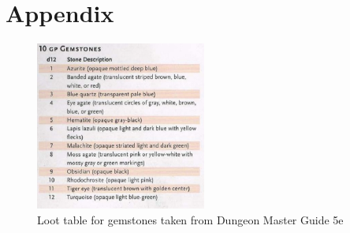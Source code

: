 \documentclass{UoYCSproject}
\begin{document}
\chapter{Appendix}
\label{cha:aB}
\begin{figure}[htb]
  \centering
    \includegraphics[width=0.5\textwidth]{figures/gemstone_table.png}
    \caption{Loot table for gemstones taken from Dungeon Master Guide 5e}
    \label{fig:loot_table}
\end{figure}
\end{document}
